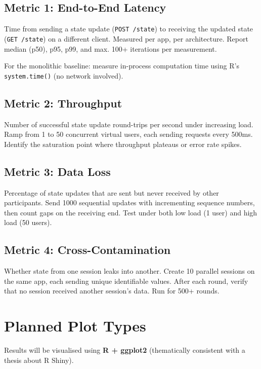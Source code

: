 \documentclass[12pt,a4paper]{article}
\begin{document}
\subsection{Metric 1: End-to-End Latency}

Time from sending a state update (\texttt{POST /state}) to receiving the updated state (\texttt{GET /state}) on a different client. Measured per app, per architecture. Report median (p50), p95, p99, and max. 100+ iterations per measurement.

For the monolithic baseline: measure in-process computation time using R's \texttt{system.time()} (no network involved).

\subsection{Metric 2: Throughput}

Number of successful state update round-trips per second under increasing load. Ramp from 1 to 50 concurrent virtual users, each sending requests every 500ms. Identify the saturation point where throughput plateaus or error rate spikes.

\subsection{Metric 3: Data Loss}

Percentage of state updates that are sent but never received by other participants. Send 1000 sequential updates with incrementing sequence numbers, then count gaps on the receiving end. Test under both low load (1 user) and high load (50 users).

\subsection{Metric 4: Cross-Contamination}

Whether state from one session leaks into another. Create 10 parallel sessions on the same app, each sending unique identifiable values. After each round, verify that no session received another session's data. Run for 500+ rounds.

\section{Planned Plot Types}

Results will be visualised using \textbf{R + ggplot2} (thematically consistent with a thesis about R Shiny).
\end{document}
